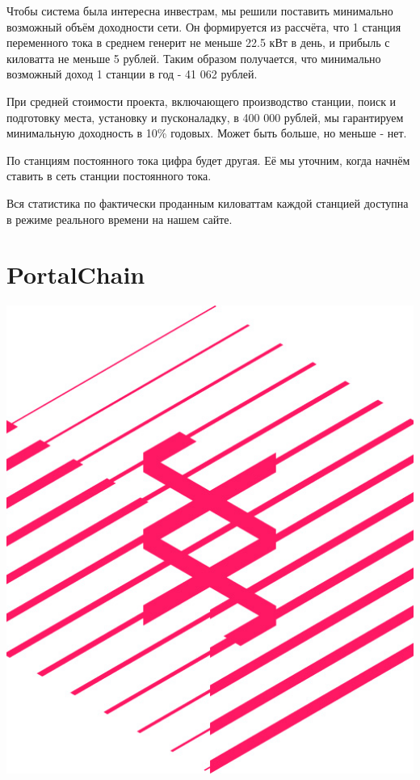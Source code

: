 \documentclass[a4paper,12pt]{report}
\begin{document}
Чтобы система была интересна инвестрам, мы решили поставить минимально возможный объём доходности сети. Он формируется из рассчёта, что 1 станция переменного тока в среднем генерит не меньше 22.5 кВт в день, и прибыль с киловатта не меньше 5 рублей. Таким образом получается, что минимально возможный доход 1 станции в год - 41 062 рублей. 

При средней стоимости проекта, включающего производство станции, поиск и подготовку места, установку и пусконаладку, в 400 000 рублей, мы гарантируем минимальную доходность в 10\% годовых. Может быть больше, но меньше - нет.


По станциям постоянного тока цифра будет другая. Её мы уточним, когда начнём ставить в сеть станции постоянного тока.


Вся статистика по фактически проданным киловаттам каждой станцией доступна в режиме реального времени на нашем сайте. 

\section{PortalChain}

\vspace*{0.5cm}
\includegraphics[width=13.6cm]{substrate-logo}
\vspace*{0.5cm}
\end{document}
